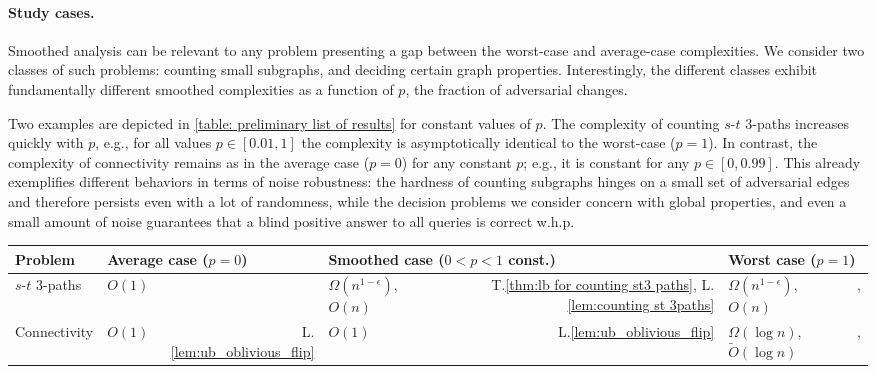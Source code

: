 \documentclass[letter,11pt]{article}
\newcommand{\omv}{\textnormal{\textsf{OMv}}\xspace}
\newcommand{\st}{$s$-$t$\xspace}
\newcommand{\paths}[3]{${#1}$-${#2}$ ${#3}$-paths\xspace}
\newcommand{\tp}{t_{\textnormal{pre}}}
\newcommand{\tq}{t_{\textnormal{q}}}
\begin{document}
\paragraph{Study cases.}
Smoothed analysis can be relevant to any problem presenting a gap between the worst-case and average-case complexities.
We consider two classes of such problems: counting small subgraphs, and
deciding certain graph properties.
Interestingly, the different classes exhibit fundamentally different smoothed complexities as a function of $p$, the fraction of adversarial changes.

Two examples are depicted in \cref{table: preliminary list of results} for constant values of $p$.
The complexity of counting
\paths{s}{t}{3} 
increases quickly with $p$, e.g., for all values $p\in[0.01, 1]$ the complexity is asymptotically identical to the worst-case ($p=1$).
In contrast, the complexity of connectivity remains as in the average case ($p=0$) for any constant $p$;
e.g., it is constant for any $p\in[0,0.99]$.
This already 
exemplifies different behaviors in terms of noise robustness:
the hardness of counting subgraphs hinges on a small set of adversarial edges and therefore persists even with a lot of randomness, while the decision problems we consider concern with global properties, and even a small amount of noise guarantees that a blind positive answer to all queries is correct w.h.p.

\begin{table*}
	\centering
	\scriptsize
	\begin{tabular}{|l|lr|lr|lr|}
		\toprule
		Problem 
		& \multicolumn{2}{l|}{Average case ($p=0$)}
		& \multicolumn{2}{l|}{Smoothed case  ($0<p<1$ const.)} 
		& \multicolumn{2}{l|}{Worst case ($p=1$)}\\ 
		\toprule
		
		\st 3-paths
		&\cellcolor{lightgreen}$O(1)$
		&\cellcolor{lightgreen} \cite{HLS22}
		&\cellcolor{lightred}$\Omega(n^{1-\epsilon})$, $O(n)$
		&\cellcolor{lightred}T.\ref{thm:lb for counting st3 paths}, 
		L.\ref{lem:counting st 3paths}
		&\cellcolor{lightred} $\Omega(n^{1-\epsilon})$, $O(n)$		
		&\cellcolor{lightred}\cite{HenzingerKNS15}, \cite{HanauerHH22}
		\\
		\midrule
		Connectivity
		&\cellcolor{lightgreen}$O(1)$
		&\cellcolor{lightgreen}L.\ref{lem:ub_oblivious_flip}
		&\cellcolor{lightgreen}$O(1)$
		&\cellcolor{lightgreen}L.\ref{lem:ub_oblivious_flip}
		&\cellcolor{lightred}  $\Omega(\log n)$, $\tilde O(\log n)$
		&\cellcolor{lightred} \cite{PatrascuD06},\cite{HuangHKPT23} 
		\\
		\bottomrule
	\end{tabular}
	~
	\caption{
		The update time complexities of \paths{s}{t}{3} and connectivity, with a non-adaptive flip adversary and constant $0<p<1$.
		The update times are for $\tq=O(1)$ and $\tp=O(n^{3-\epsilon})$.
		The \paths{s}{t}{3} lower bounds are conditioned on the \omv conjecture.
		}
	\label{table: preliminary list of results}
\end{table*}
\end{document}
